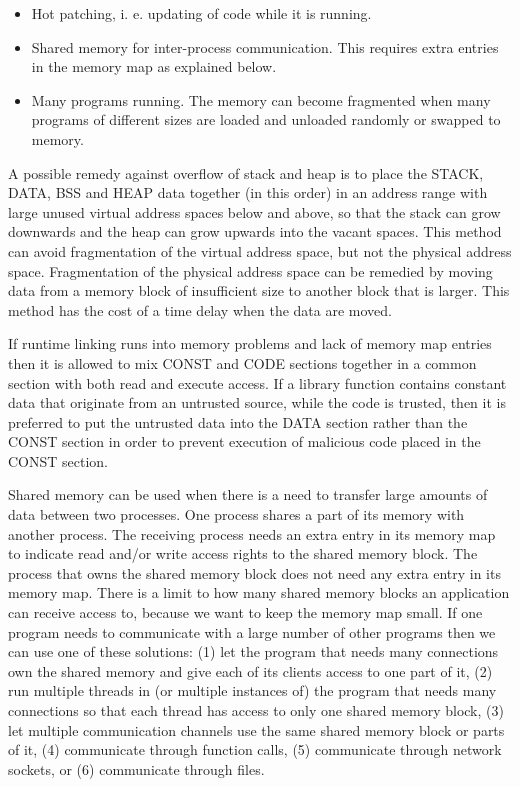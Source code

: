 \documentclass[forwardcom.tex]{subfiles}
\begin{document}
\begin{itemize}
\item Hot patching, i. e. updating of code while it is running. 

\item Shared memory for inter-process communication. This requires extra entries in the memory map as explained below.

\item Many programs running. The memory can become fragmented when many programs of different sizes are loaded and unloaded randomly or swapped to memory. 
\end{itemize}

A possible remedy against overflow of stack and heap is to place the STACK, DATA, BSS and HEAP data together (in this order) in an address range with large unused virtual address spaces below and above, so that the stack can grow downwards and the heap can grow upwards into the vacant spaces. This method can avoid fragmentation of the virtual address space, but not the physical address space. Fragmentation of the physical address space can be remedied by moving data from a memory block of insufficient size to another block that is larger. This method has the cost of a time delay when the data are moved. 
\vspace{2mm}

If runtime linking runs into memory problems and lack of memory map entries then it is allowed to mix CONST and CODE sections together in a common section with both read and execute access. If a library function contains constant data that originate from an untrusted source, while the code is trusted, then it is preferred to put the untrusted data into the DATA section rather than the CONST section in order to prevent execution of malicious code placed in the CONST section.
\vspace{2mm}

\label{sharedMemory}
Shared memory can be used when there is a need to transfer large amounts of data between two processes. One process shares a part of its memory with another process. The receiving process needs an extra entry in its memory map to indicate read and/or write access rights to the shared memory block. The process that owns the shared memory block does not need any extra entry in its memory map. There is a limit to how many shared memory blocks an application can receive access to, because we want to keep the memory map small. If one program needs to communicate with a large number of other programs then we can use one of these solutions: (1) let the program that needs many connections own the shared memory and give each of its clients access to one part of it, (2) run multiple threads in (or multiple instances of) the program that needs many connections so that each thread has access to only one shared memory block, (3) let multiple communication channels use the same shared memory block or parts of it, (4) communicate through function calls, (5) communicate through network sockets, or (6) communicate through files. 
\vspace{2mm}
\end{document}
